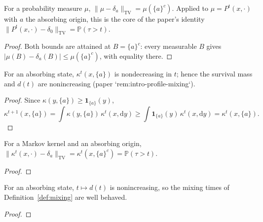 \begin{lemma}
  \label{lem:tv-dirac}
  \leanok
  For a probability measure $\mu$, $\|\mu-\delta_a\|_{\mathrm{TV}} = \mu(\{a\}^c)$.
  Applied to $\mu = P^t(x,\cdot)$ with $a$ the absorbing origin, this is the core of
  the paper's identity $\|P^t(x,\cdot)-\delta_0\|_{\mathrm{TV}} = \mathbb{P}(\tau > t)$.
\end{lemma}
\begin{proof}
  \leanok
  Both bounds are attained at $B=\{a\}^c$: every measurable $B$ gives
  $|\mu(B)-\delta_a(B)| \le \mu(\{a\}^c)$, with equality there.
\end{proof}

\begin{lemma}
  \label{lem:absorb-mono}
  \leanok
  For an absorbing state, $\kappa^t(x,\{a\})$ is nondecreasing in $t$; hence the
  survival mass and $d(t)$ are nonincreasing (paper `rem:intro-profile-mixing`).
\end{lemma}
\begin{proof}
  \leanok
  Since $\kappa(y,\{a\})\geq\mathbf 1_{\{a\}}(y)$,
  \[
    \kappa^{t+1}(x,\{a\})
      =\int \kappa(y,\{a\})\,\kappa^t(x,\mathrm dy)
      \geq\int \mathbf 1_{\{a\}}(y)\,\kappa^t(x,\mathrm dy)
      =\kappa^t(x,\{a\}).
  \]
\end{proof}

\begin{lemma}
  \label{lem:tv-pow-dirac}
  \leanok
  For a Markov kernel and an absorbing origin,
  $\|\kappa^t(x,\cdot)-\delta_a\|_{\mathrm{TV}} = \kappa^t(x,\{a\}^c) = \mathbb{P}(\tau>t)$.
\end{lemma}
\begin{proof}\leanok{}\end{proof}

\begin{lemma}
  \label{lem:dseq-antitone}
  \leanok
  For an absorbing state, $t\mapsto d(t)$ is nonincreasing, so the mixing times of
  Definition~\ref{def:mixing} are well behaved.
\end{lemma}
\begin{proof}\leanok{}\end{proof}

